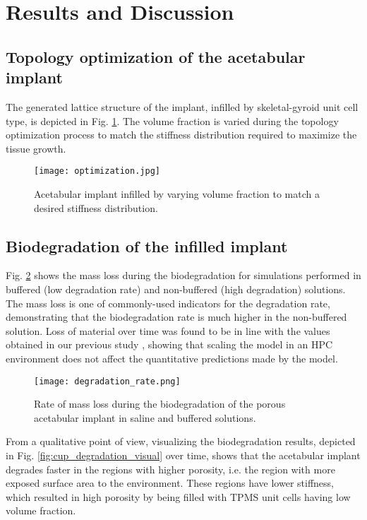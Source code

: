 \section{Results and Discussion}

\subsection{Topology optimization of the acetabular implant}

The generated lattice structure of the implant, infilled by skeletal-gyroid unit cell type, is depicted in Fig. \ref{fig:cup_optimization}. The volume fraction is varied during the topology optimization process to match the stiffness distribution required to maximize the tissue growth. 

\begin{figure}[h]
\centering
\medskip
\texttt{[image: optimization.jpg]}
\caption[Infilled acetabular implant]{Acetabular implant infilled by varying volume fraction to match a desired stiffness distribution.} \label{fig:cup_optimization}
\end{figure}

\subsection{Biodegradation of the infilled implant}

Fig. \ref{fig:cup_degradation_rate} shows the mass loss during the biodegradation for simulations performed in buffered (low degradation rate) and non-buffered (high degradation) solutions. The mass loss is one of commonly-used indicators for the degradation rate, demonstrating that the biodegradation rate is much higher in the non-buffered solution. Loss of material over time was found to be in line with the values obtained in our previous study \cite{Barzegari2021}, showing that scaling the model in an HPC environment does not affect the quantitative predictions made by the model.

\begin{figure}[h]
\centering
\medskip
\texttt{[image: degradation\_rate.png]}
\caption[Biodegradation rate for the acetabular implant]{Rate of mass loss during the biodegradation of the porous acetabular implant in saline and buffered solutions.} \label{fig:cup_degradation_rate}
\end{figure}

From a qualitative point of view, visualizing the biodegradation results, depicted in Fig. \ref{fig:cup_degradation_visual} over time, shows that the acetabular implant degrades faster in the regions with higher porosity, i.e. the region with more exposed surface area to the environment. These regions have lower stiffness, which resulted in high porosity by being filled with TPMS unit cells having low volume fraction.

